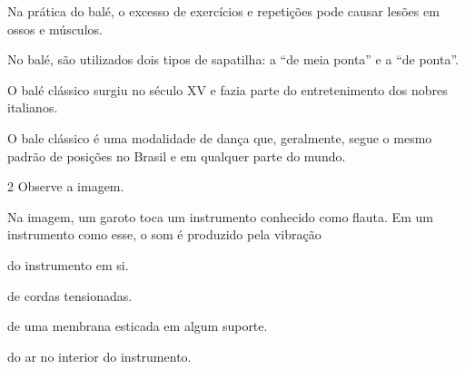 \begin{escolha}
\begin{escolha}
\item
  Na prática do balé, o excesso de exercícios e repetições pode causar
  lesões em ossos e músculos.
\item
  No balé, são utilizados dois tipos de sapatilha: a ``de meia ponta'' e
  a ``de ponta''.
\item
  O balé clássico surgiu no século XV e fazia parte do entretenimento
  dos nobres italianos.
\item
  O bale clássico é uma modalidade de dança que, geralmente, segue o
  mesmo padrão de posições no Brasil e em qualquer parte do mundo.
\end{escolha}


\num{2} Observe a imagem.


Na imagem, um garoto toca um instrumento conhecido como flauta. Em um instrumento como esse, o som é produzido pela vibração

\begin{escolha}
\item
  do instrumento em si.
\item
  de cordas tensionadas.
\item
  de uma membrana esticada em algum suporte.
\item
  do ar no interior do instrumento.
\end{escolha}

\end{escolha}
